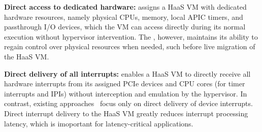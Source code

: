 %
%
%
%
%
%
%

%
{\bf Direct access to dedicated hardware:} 
\na assigns a HaaS VM with 
dedicated hardware resources, namely 
physical CPUs, memory, local APIC timers, and passthrough I/O devices,
which the VM can access directly 
during its normal execution without hypervisor intervention. 
The \sna, however, maintains its ability to
regain control over physical resources when needed, such 
before live migration of the HaaS VM.


{\bf Direct delivery of all interrupts:}
\na enables a HaaS VM to directly receive all hardware interrupts from 
its assigned PCIe devices and CPU cores (for timer interrupts and IPIs) 
without interception and emulation by the hypervisor.
In contrast, existing approaches~\cite{vfio,postedinterrupt,amit:2015,tu:2015}
focus only on direct delivery of device interrupts.
Direct interrupt delivery to the HaaS VM greatly
reduces interrupt processing latency, which is imoportant for 
latency-critical applications.


